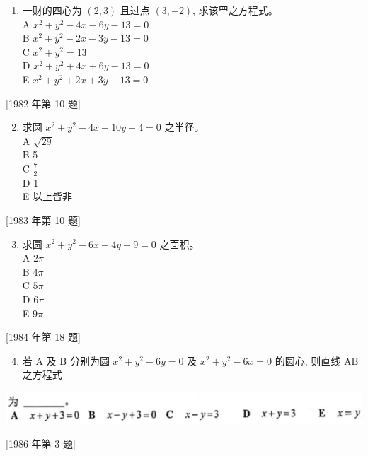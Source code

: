 \documentclass[10pt]{article}
\begin{document}
\begin{enumerate}
  \item 一财的四心为 $(2,3)$ 且过点 $(3,-2)$, 求该罒之方程式。\\
A $x^{2}+y^{2}-4 x-6 y-13=0$\\
B $x^{2}+y^{2}-2 x-3 y-13=0$\\
C $x^{2}+y^{2}=13$\\
D $x^{2}+y^{2}+4 x+6 y-13=0$\\
E $x^{2}+y^{2}+2 x+3 y-13=0$
\end{enumerate}

[1982 年第 10 题]

\begin{enumerate}
  \setcounter{enumi}{1}
  \item 求圆 $x^{2}+y^{2}-4 x-10 y+4=0$ 之半径。\\
A $\sqrt{29}$\\
B 5\\
C $\frac{7}{2}$\\
D 1\\
E 以上皆非
\end{enumerate}

[1983 年第 10 题]

\begin{enumerate}
  \setcounter{enumi}{2}
  \item 求圆 $x^{2}+y^{2}-6 x-4 y+9=0$ 之面积。\\
A $2 \pi$\\
B $4 \pi$\\
C $5 \pi$\\
D $6 \pi$\\
E $9 \pi$
\end{enumerate}

[1984 年第 18 题]

\begin{enumerate}
  \setcounter{enumi}{3}
  \item 若 $\mathrm{A}$ 及 $\mathrm{B}$ 分别为圆 $x^{2}+y^{2}-6 y=0$ 及 $x^{2}+y^{2}-6 x=0$ 的圆心, 则直线 $\mathrm{AB}$ 之方程式
\end{enumerate}

\begin{center}
\includegraphics[max width=\textwidth]{2024_06_07_f484519cd4dc635602b3g-02}
\end{center}

[1986 年第 3 题]
\end{document}

